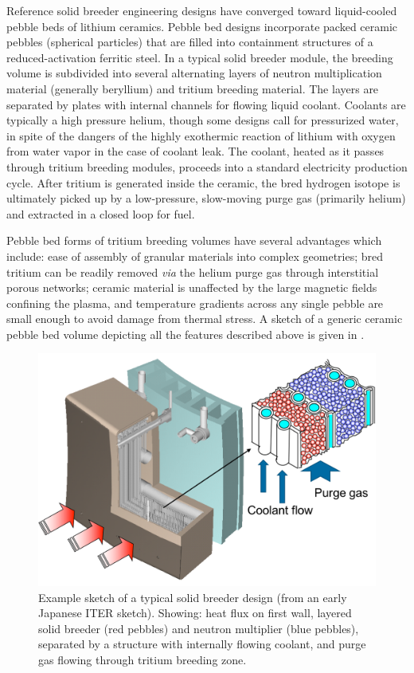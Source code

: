Reference solid breeder engineering designs have converged toward liquid-cooled pebble beds of lithium ceramics.  Pebble bed designs incorporate packed ceramic pebbles (spherical particles) that are filled into containment structures of a reduced-activation ferritic steel. In a typical solid breeder module, the breeding volume is subdivided into several alternating layers of neutron multiplication material (generally beryllium) and tritium breeding material. The layers are separated by plates with internal channels for flowing liquid coolant. Coolants are typically a high pressure helium, though some designs call for pressurized water, in spite of the dangers of the highly exothermic reaction of lithium with oxygen from water vapor in the case of coolant leak. The coolant, heated as it passes through tritium breeding modules, proceeds into a standard electricity production cycle. After tritium is generated inside the ceramic, the bred hydrogen isotope is ultimately picked up by a low-pressure, slow-moving purge gas (primarily helium) and extracted in a closed loop for fuel. 

Pebble bed forms of tritium breeding volumes have several advantages which include: ease of assembly of granular materials into complex geometries; bred tritium can be readily removed \textit{via} the helium purge gas through interstitial porous networks; ceramic material is unaffected by the large magnetic fields confining the plasma, and temperature gradients across any single pebble are small enough to avoid damage from thermal stress. A sketch of a generic ceramic pebble bed volume depicting all the features described above is given in .

\begin{figure}[ht]
	\centering
	\includegraphics[width=\singleimagewidth]{figures/JP-solid-breeder-sketch} 
	\caption{Example sketch of a typical solid breeder design (from an early Japanese ITER sketch). Showing: heat flux on first wall, layered solid breeder (red pebbles) and neutron multiplier (blue pebbles), separated by a structure with internally flowing coolant, and purge gas flowing through tritium breeding zone.}
	\label{fig:solid-breeder-sketch}
\end{figure}


